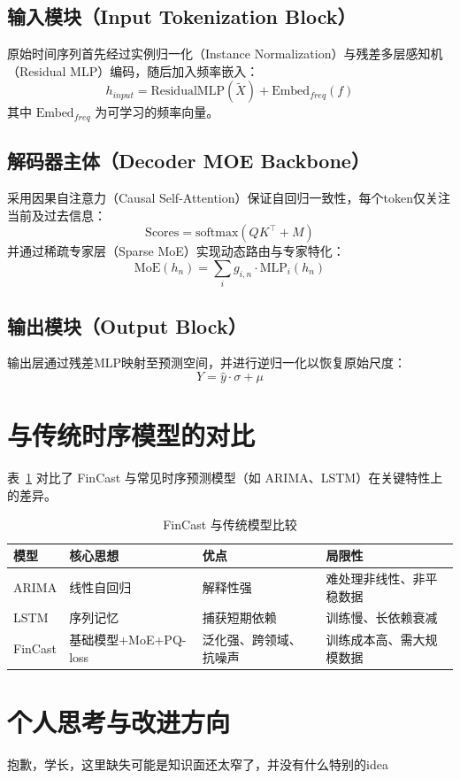 \documentclass[UTF8]{article}
\begin{document}
\subsection{输入模块（Input Tokenization Block）}
原始时间序列首先经过实例归一化（Instance Normalization）与残差多层感知机（Residual MLP）编码，随后加入频率嵌入：
\[
h_{input} = \text{ResidualMLP}(\tilde{X}) + \text{Embed}_{freq}(f)
\]
其中 $\text{Embed}_{freq}$ 为可学习的频率向量。

\subsection{解码器主体（Decoder MOE Backbone）}
采用因果自注意力（Causal Self-Attention）保证自回归一致性，每个token仅关注当前及过去信息：
\[
\text{Scores} = \text{softmax}(QK^\top + M)
\]
并通过稀疏专家层（Sparse MoE）实现动态路由与专家特化：
\[
\text{MoE}(h_n) = \sum_i g_{i,n} \cdot \text{MLP}_i(h_n)
\]

\subsection{输出模块（Output Block）}
输出层通过残差MLP映射至预测空间，并进行逆归一化以恢复原始尺度：
\[
Y = \hat{y} \cdot \sigma + \mu
\]

\section{与传统时序模型的对比}
表~\ref{tab:comparison} 对比了 FinCast 与常见时序预测模型（如 ARIMA、LSTM）在关键特性上的差异。

\begin{table}[h]
\centering
\caption{FinCast 与传统模型比较}
\label{tab:comparison}
\begin{tabular}{@{}llll@{}}
\toprule
模型 & 核心思想 & 优点 & 局限性 \\ \midrule
ARIMA & 线性自回归 & 解释性强 & 难处理非线性、非平稳数据 \\
LSTM & 序列记忆 & 捕获短期依赖 & 训练慢、长依赖衰减 \\
FinCast & 基础模型+MoE+PQ-loss & 泛化强、跨领域、抗噪声 & 训练成本高、需大规模数据 \\ \bottomrule
\end{tabular}
\end{table}

\section{个人思考与改进方向}
抱歉，学长，这里缺失可能是知识面还太窄了，并没有什么特别的idea
\end{document}
